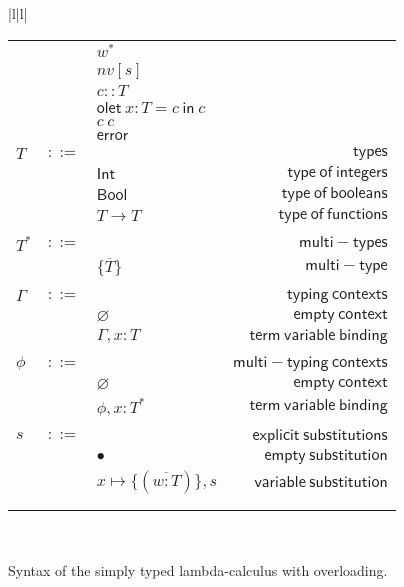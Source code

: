 \documentclass[preprint,authoryear,sort&compress,9pt,nocopyrightspace]{article}
\newcommand{\subxD}{x \mapsto \{(\overline{w:T})\},s}
\newcommand{\ascrip}[1]{#1::T}
\newcommand{\oletP}[3]{\mathsf{olet} \ x : #1 = #2 \ \mathsf{in}  \ #3}
\newcommand{\boolt}{\mathsf{Bool}}
\newcommand{\intt}{\mathsf{Int}}
\newcommand{\mtP}[1]{#1^{*}}
\newcommand{\mtC}[1]{\{\overline {#1}\}}
\newcommand{\emt}{\phi}
\begin{document}
\begin{figure}
\begin{small}
\begin{center}
\begin{tabular}{|l|l|}
\begin{tabular}{l c l r}
&&$\mtP{w}$&\\
&&$nv[s]$&\\
&&$\ascrip{c}$&\\
&&$\oletP {T}{c}{c}$&\\
&&$c \ c $&\\
&&$\mathsf{error}$&\\
$T$&$::=$&&$\mathsf {types}$\\
&&$\intt$&$\mathsf {type \ of \ integers}$\\
&&$\boolt$&$\mathsf {type \ of \ booleans}$\\
&&$T \to T$&$\mathsf {type \ of \ functions}$\\
&&&\\
$\mtP{T}$&$::=$&&$\mathsf {multi-types}$\\
&&$\mtC{T}$&$\mathsf {multi-type}$\\
&&&\\
$\Gamma$&$::=$&&$\mathsf {typing \ contexts}$\\
&&$\varnothing$&$\mathsf {empty \ context}$\\
&&$\Gamma , x:T$&$\mathsf {term \ variable \ binding}$\\
&&&\\
$\emt$&$::=$&&$\mathsf {multi-typing \ contexts}$\\
&&$\varnothing$&$\mathsf {empty \ context}$\\
&&$\emt,x: \mtP{T}$&$\mathsf {term \ variable \ binding}$\\
&&&\\
$s$&$::=$&&$\mathsf {explicit \ substitutions}$\\
&&$ \bullet$&$\mathsf {empty \ substitution}$\\
&&$\subxD$&$\mathsf {variable \ substitution}$\\
&&&\\
&&&\\
\end{tabular}\\
\hline
\end{tabular}
\hspace*{-2cm}
\caption{Syntax of the simply typed lambda-calculus with overloading.}
\label{figure:sencilla}
\end{center}
\end{small}
\end{figure}
\end{document}
